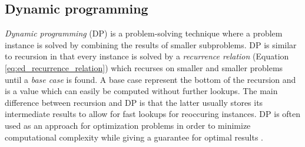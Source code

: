\documentclass[thesis.tex]{subfiles}
\begin{document}
\subsection{Dynamic programming}
\label{sec:dynamic_programming}
\textit{Dynamic programming} (DP) is a problem-solving technique where a problem instance is solved by combining the results of smaller subproblems. DP is similar to recursion in that every instance is solved by a \textit{recurrence relation} (Equation \ref{eq:ed_recurrence_relation}) which recurses on smaller and smaller problems until a \textit{base case} is found. A base case represent the bottom of the recursion and is a value which can easily be computed without further lookups. The main difference between recursion and DP is that the latter usually stores its intermediate results to allow for fast lookups for reoccuring instances. DP is often used as an approach for optimization problems in order to minimize computational complexity while giving a guarantee for optimal results \cite[Chapter 9]{algorithms_sequential_parallell_and_distributed}.
\end{document}
